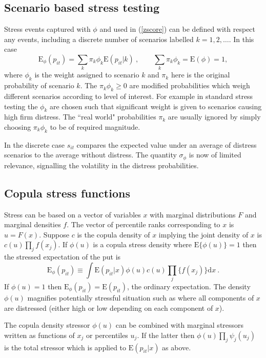 \documentclass[12pt]{article}
\newcommand{\E}{\mathrm{E}}
\newcommand{\Es}{\E_\phi}
\newcommand{\de}{\mathrm{d}}
\newcommand{\eref}[1]{(\ref{#1})}
\newcommand{\cq}{\ , \qquad}
\newcommand{\be}[1]{\begin{equation}\label{#1}}
\newcommand{\ee}{\end{equation}}
\begin{document}
\subsection{Scenario based stress testing}
 Stress events captured with $\phi$ and used  in \eref{zscore}  can be defined with respect any events, including a discrete number of scenarios labelled $k=1,2, \ldots$.   In this case
$$
\Es(p_{it})= \sum_k \pi_k\phi_k\E(p_{it}|k)\cq \sum_k\pi_k\phi_k = \E(\phi) = 1 ,
$$
where $\phi_k$ is the weight assigned to scenario $k$ and $\pi_k$ here is the original probability of scenario $k$.   The $\pi_k\phi_k\ge 0$ are  modified  probabilities which weigh different scenarios according to level of interest.   For example in standard stress testing the $\phi_k$ are chosen such that significant weight is given to scenarios causing high  firm distress.   The ``real world" probabilities $\pi_k$ are  usually ignored by  simply choosing  $\pi_k\phi_k$ to be of  required magnitude.

In the discrete case $s_{it}$ compares the expected value under an average of distress scenarios to the average without distress.  The quantity $\sigma_\phi$ is now of limited relevance, signalling the volatility in the distress probabilities.


\subsection{Copula stress functions}


Stress can be based on a vector of variables $x$ with marginal distributions $F$ and marginal densities $f$. The vector of percentile ranks corresponding to $x$ is $u=F(x)$.  Suppose $c$ is the copula density of $x$ implying the joint density of $x$ is $c(u)\prod_jf(x_j)$.    If   $\phi(u)$ is a copula stress density where $\E\{\phi(u)\}=1$ then the stressed expectation of the put is
\be{copula}
\Es(p_{it}) \equiv \int \E(p_{it}|x)\phi(u)c(u)\prod_j\{f(x_j)\}  \de x   \ .
\ee
If $\phi(u)=1$  then $\Es(p_{it})=\E(p_{it})$, the ordinary expectation.   The density $\phi(u)$ magnifies potentially stressful situation such as where all components of $x$ are distressed (either high or low depending on each component of $x$).

The copula density stressor $\phi(u)$  can be combined with marginal stressors written as functions of $x_j$ or  percentiles $u_j$.  If the latter then $\phi(u)\prod_j\psi_j(u_j)$ is the total stressor which is applied to $\E(p_{it}|x)$ as above.
\end{document}
